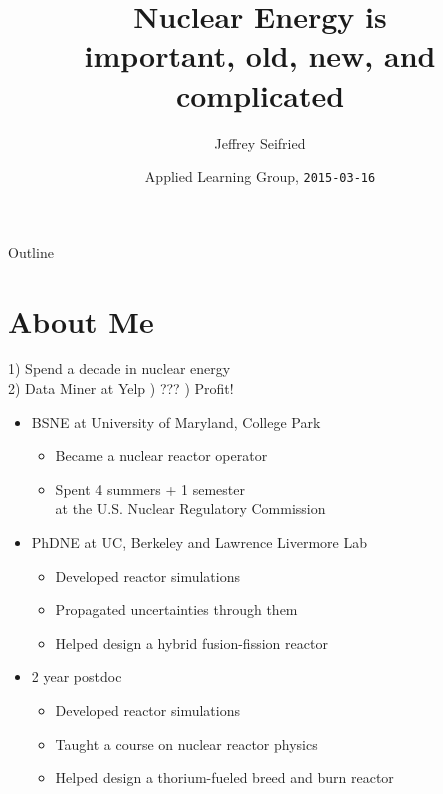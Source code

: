 \documentclass{beamer}
\title{Nuclear Energy is \\ important, old, new, and complicated}
\author{Jeffrey Seifried}
\institute{Ad Delivery Team, Yelp}
\date{Applied Learning Group, \texttt{2015-03-16}}
\begin{document}
\begin{frame}
  \titlepage
\end{frame}

\begin{frame}{Outline}
  \tableofcontents
\end{frame}


\section{About Me}

    \begin{frame}{1) Spend a decade in nuclear energy \\ 2) Data Miner at Yelp \; ) ??? \; ) Profit!}

        \begin{itemize}

            \item BSNE at University of Maryland, College Park
            \begin{itemize}
                \item Became a nuclear reactor operator
                \item Spent 4 summers + 1 semester \\ at the U.S. Nuclear Regulatory Commission
            \end{itemize}

            \pause

            \item PhDNE at UC, Berkeley and Lawrence Livermore Lab
            \begin{itemize}
                \item Developed reactor simulations
                \item Propagated uncertainties through them
                \item Helped design a hybrid fusion-fission reactor
            \end{itemize}

            \pause

            \item 2 year postdoc
            \begin{itemize}
                \item Developed reactor simulations
                \item Taught a course on nuclear reactor physics
                \item Helped design a thorium-fueled breed and burn reactor
            \end{itemize}
        \end{itemize}

    \end{frame}
\end{document}
